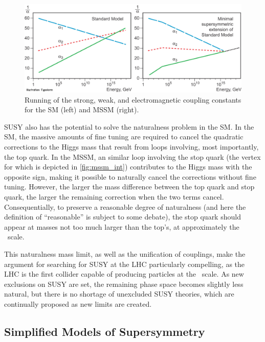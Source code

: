 \begin{centering}
\begin{figure}[!hbt]
\myfloatalign
\includegraphics[width=.9\linewidth]{figures/theory/phypub4highen.jpg}
\caption{Running of the strong, weak, and electromagnetic coupling constants for the \ac{SM} (left) and \ac{MSSM} (right). \cite{nobel2004}}
\label{fig:gut_mssm}
\end{figure}
\end{centering}

\ac{SUSY} also has the potential to solve the naturalness problem in the \ac{SM}. In the \ac{SM}, the massive amounts of fine tuning are required to cancel the quadratic corrections to the Higgs mass that result from loops involving, most importantly, the top quark. In the \ac{MSSM}, an similar loop involving the stop quark (the vertex for which is depicted in \autoref{fig:mssm_int}) contributes to the Higgs mass with the opposite sign, making it possible to naturally cancel the corrections without fine tuning. However, the larger the mass difference between the top quark and stop quark, the larger the remaining correction when the two terms cancel. Consequentially, to preserve a reasonable degree of naturalness (and here the definition of ``reasonable'' is subject to some debate), the stop quark should appear at masses not too much larger than the top's, at approximately the \tev~scale. 

This naturalness mass limit, as well as the unification of couplings, make the argument for searching for \ac{SUSY} at the \ac{LHC} particularly compelling, as the \ac{LHC} is the first collider capable of producing particles at the \tev~scale. As new exclusions on \ac{SUSY} are set, the remaining phase space becomes slightly less natural, but there is no shortage of unexcluded \ac{SUSY} theories, which are continually proposed as new limits are created. 

\subsection{Simplified Models of Supersymmetry}
\label{sec:simplified_models}

